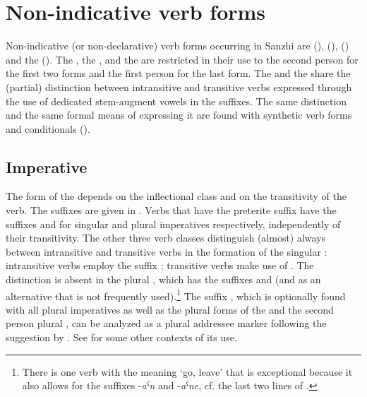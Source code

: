 \chapter{Non-indicative verb forms}
\label{cpt:verbs-nondeclarative}

Non-indicative (or non-declarative) verb forms occurring in Sanzhi are  (),  (),  () and the  (). The , the , and the  are restricted in their use to the second person for the first two forms and the first person for the last form. The  and the  share the (partial) distinction between intransitive and transitive verbs expressed through the use of dedicated stem-augment vowels in the suffixes. The same distinction and the same formal means of expressing it are found with synthetic verb forms and conditionals ().



\section{Imperative}
\label{sec:imperative}

The form of the  depends on the inflectional class and on the transitivity of the verb. The suffixes are given in . Verbs that have the preterite suffix  have the suffixes  and  for singular and plural imperatives respectively, independently of their transitivity. The other three verb classes distinguish (almost) always between intransitive and transitive verbs in the formation of the singular : intransitive verbs employ the suffix ; transitive verbs make use of . The distinction is absent in the plural , which has the suffixes and  (and  as an alternative that is not frequently used).\footnote{There is one verb with the meaning `go, leave' that is exceptional because it also allows for the suffixes -\textit{aˁn} and -\textit{aˁne}, cf. the last two lines of .} The suffix , which is optionally found with all plural imperatives as well as the plural forms of the  and the second person plural , can be analyzed as a plural addressee marker following the suggestion by \citet[163]{Sumbatova.Lander2014}. See  for some other contexts of its use.

